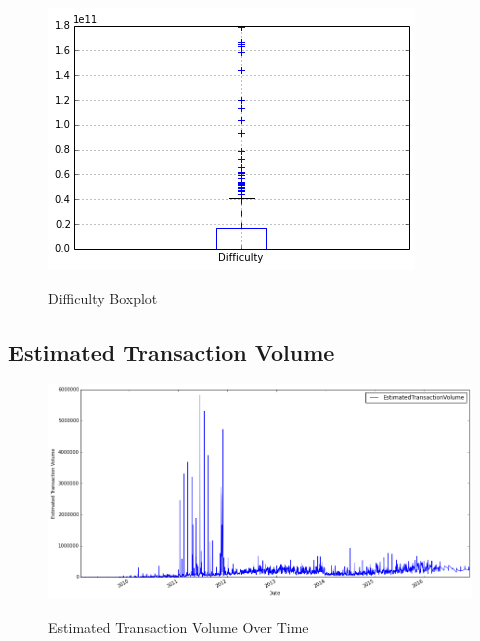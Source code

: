 \begin{figure}[bth]
  \myfloatalign
  {\includegraphics[width=1\linewidth]
    {gfx/difficulty-boxplot}}
  \caption{Difficulty Boxplot}
  \label{fig:difficulty-boxplot}
\end{figure}

\clearpage

\subsection{Estimated Transaction Volume}
\label{sec:estimated-transaction-volume}

\begin{figure}[bth]
  \myfloatalign
  {\includegraphics[width=1\linewidth]
    {gfx/estimated-transaction-volume-over-time}}
  \caption{Estimated Transaction Volume Over Time}
  \label{fig:estimated-transaction-volume-over-time}
\end{figure}

